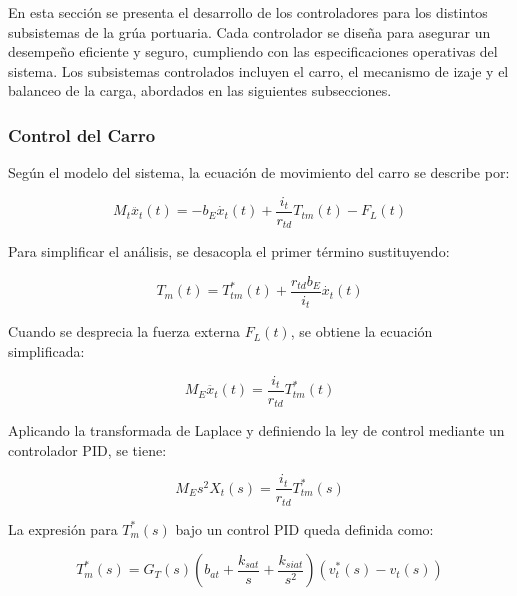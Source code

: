 \documentclass{article}
\begin{document}
            En esta sección se presenta el desarrollo de los controladores para los distintos subsistemas de la grúa portuaria. Cada controlador se diseña para asegurar un desempeño eficiente y seguro, cumpliendo con las especificaciones operativas del sistema. Los subsistemas controlados incluyen el carro, el mecanismo de izaje y el balanceo de la carga, abordados en las siguientes subsecciones.

            \subsubsection{Control del Carro} 

            Según el modelo del sistema, la ecuación de movimiento del carro se describe por:
            
            \begin{equation}
                M_t \ddot{x_{t}}(t) = - b_E \dot{x_{t}}(t) + \frac{i_t}{r_{td}} T_{tm}(t) - F_{L}(t) 
            \end{equation}
            
            Para simplificar el análisis, se desacopla el primer término sustituyendo:
            
            \begin{equation}
            T_m(t) = T_{tm}^*(t) + \frac{r_{td} b_E}{i_t} \dot{x_t}(t)
            \end{equation}
            
            Cuando se desprecia la fuerza externa $F_{L}(t)$, se obtiene la ecuación simplificada:
            
            \begin{equation}
                M_E \ddot{x_{t}}(t) =  \frac{i_t}{r_{td}} T_{tm}^*(t) 
            \end{equation}
            
            Aplicando la transformada de Laplace y definiendo la ley de control mediante un controlador PID, se tiene:
            
            \begin{equation}
                M_E s^2 X_t(s) =  \frac{i_t}{r_{td}} T_{tm}^*(s)
            \end{equation}
            
            La expresión para $T_m^*(s)$ bajo un control PID queda definida como:
            
            \begin{equation}
                T_m^*(s) = G_T(s)\left( b_{at} + \frac{k_{sat}}{s} + \frac{k_{siat}}{s^2} \right)(v_t^*(s) - v_t(s))
            \end{equation}
            
\end{document}
